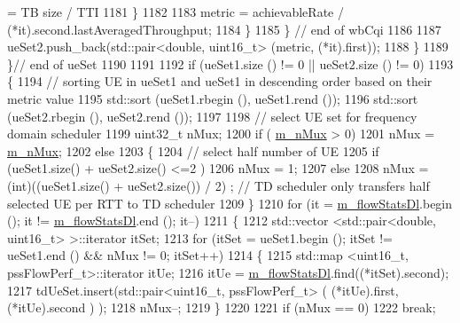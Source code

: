\begin{DoxyCode}
{       = TB size / TTI}
1181                         \}
1182     
1183                       metric = achievableRate / (*it).second.lastAveragedThroughput;
1184                    \}
1185                 \} \textcolor{comment}{// end of wbCqi}
1186     
1187               ueSet2.push\_back(std::pair<double, uint16\_t> (metric, (*it).first));
1188             \}
1189         \}\textcolor{comment}{// end of ueSet}
1190     
1191     
1192       \textcolor{keywordflow}{if} (ueSet1.size () != 0 || ueSet2.size () != 0)
1193         \{
1194           \textcolor{comment}{// sorting UE in ueSet1 and ueSet1 in descending order based on their metric value}
1195           std::sort (ueSet1.rbegin (), ueSet1.rend ());
1196           std::sort (ueSet2.rbegin (), ueSet2.rend ());
1197  
1198           \textcolor{comment}{// select UE set for frequency domain scheduler}
1199           uint32\_t nMux;
1200           \textcolor{keywordflow}{if} ( \hyperlink{classns3_1_1PssFfMacScheduler_a5f2880c5cc34c2189db6e92bc2cae47e}{m\_nMux} > 0)
1201             nMux = \hyperlink{classns3_1_1PssFfMacScheduler_a5f2880c5cc34c2189db6e92bc2cae47e}{m\_nMux};
1202           \textcolor{keywordflow}{else}
1203             \{
1204               \textcolor{comment}{// select half number of UE}
1205               \textcolor{keywordflow}{if} (ueSet1.size() + ueSet2.size() <=2 )
1206                 nMux = 1;
1207               \textcolor{keywordflow}{else}
1208                 nMux = (int)((ueSet1.size() + ueSet2.size()) / 2) ; \textcolor{comment}{// TD scheduler only transfers half
       selected UE per RTT to TD scheduler}
1209             \}
1210           \textcolor{keywordflow}{for} (it = \hyperlink{classns3_1_1PssFfMacScheduler_add144474dc7bd9d89b93ff14bc8d27c9}{m\_flowStatsDl}.begin (); it != \hyperlink{classns3_1_1PssFfMacScheduler_add144474dc7bd9d89b93ff14bc8d27c9}{m\_flowStatsDl}.end (); it--)
1211            \{
1212              std::vector <std::pair<double, uint16\_t> >::iterator itSet;
1213              \textcolor{keywordflow}{for} (itSet = ueSet1.begin (); itSet != ueSet1.end () && nMux != 0; itSet++)
1214                \{  
1215                  std::map <uint16\_t, pssFlowPerf\_t>::iterator itUe;
1216                  itUe = \hyperlink{classns3_1_1PssFfMacScheduler_add144474dc7bd9d89b93ff14bc8d27c9}{m\_flowStatsDl}.find((*itSet).second);
1217                  tdUeSet.insert(std::pair<uint16\_t, pssFlowPerf\_t> ( (*itUe).first, (*itUe).second ) );
1218                  nMux--;
1219                \}
1220            
1221              \textcolor{keywordflow}{if} (nMux == 0)
1222                \textcolor{keywordflow}{break};

\end{DoxyCode}
